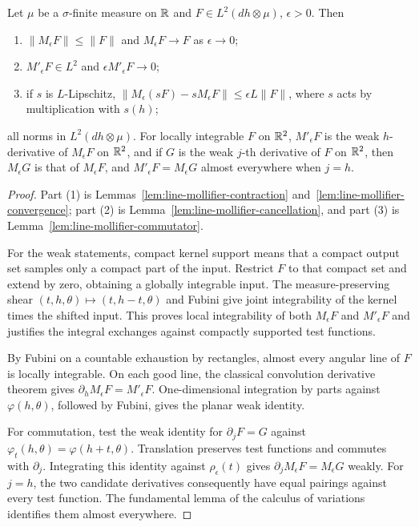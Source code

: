 \begin{lemma}
\label{lem:line-mollifier}
\leanok
Let $\mu$ be a $\sigma$-finite measure on $\mathbb{R}$ and $F\in L^2(dh\otimes\mu)$,
$\epsilon>0$. Then
\begin{enumerate}
  \item $\|M_\epsilon F\|\le\|F\|$ and $M_\epsilon F\to F$ as $\epsilon\to0$;
  \item $M'_\epsilon F\in L^2$ and $\epsilon M'_\epsilon F\to0$;
  \item if $s$ is $L$-Lipschitz, $\|M_\epsilon(sF)-sM_\epsilon F\|\le\epsilon L\|F\|$, where
    $s$ acts by multiplication with $s(h)$;
\end{enumerate}
all norms in $L^2(dh\otimes\mu)$. For locally integrable $F$ on $\mathbb{R}^2$, $M'_\epsilon F$ is the weak
$h$-derivative of $M_\epsilon F$ on $\mathbb{R}^2$, and if $G$ is the weak $j$-th derivative of $F$ on $\mathbb{R}^2$,
then $M_\epsilon G$ is that of $M_\epsilon F$, and $M'_\epsilon F=M_\epsilon G$ almost everywhere when
$j=h$.
\end{lemma}

\begin{proof}
\leanok
Part (1) is Lemmas~\ref{lem:line-mollifier-contraction}
and~\ref{lem:line-mollifier-convergence}; part (2) is
Lemma~\ref{lem:line-mollifier-cancellation}, and part (3) is
Lemma~\ref{lem:line-mollifier-commutator}.

For the weak statements, compact kernel support means that a compact output
set samples only a compact part of the input. Restrict $F$ to that compact
set and extend by zero, obtaining a globally integrable input. The
measure-preserving shear $(t,h,\theta)\mapsto(t,h-t,\theta)$ and Fubini
give joint integrability of the kernel times the shifted input. This proves
local integrability of both $M_\epsilon F$ and $M'_\epsilon F$ and justifies
the integral exchanges against compactly supported test functions.

By Fubini on a countable exhaustion by rectangles, almost every angular
line of $F$ is locally integrable. On each good line, the classical
convolution derivative theorem gives
$\partial_hM_\epsilon F=M'_\epsilon F$. One-dimensional integration by
parts against $\varphi(h,\theta)$, followed by Fubini, gives the planar
weak identity.

For commutation, test the weak identity for $\partial_jF=G$ against
$\varphi_t(h,\theta)=\varphi(h+t,\theta)$. Translation preserves test
functions and commutes with $\partial_j$. Integrating this identity against
$\rho_\epsilon(t)$ gives $\partial_jM_\epsilon F=M_\epsilon G$ weakly.
For $j=h$, the two candidate derivatives consequently have equal pairings
against every test function. The fundamental lemma of the calculus of
variations identifies them almost everywhere.
\end{proof}

